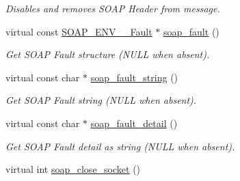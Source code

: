 \begin{DoxyCompactItemize}
\begin{DoxyCompactList}\small\item\em Disables and removes SOAP Header from message. \item\end{DoxyCompactList}\item 
\hypertarget{classPASSSubscriberPortBindingProxy_a106ca5a9746ff61aa711f6ff04305131}{
virtual const \hyperlink{structSOAP__ENV____Fault}{SOAP\_\-ENV\_\-\_\-Fault} $\ast$ \hyperlink{classPASSSubscriberPortBindingProxy_a106ca5a9746ff61aa711f6ff04305131}{soap\_\-fault} ()}
\label{classPASSSubscriberPortBindingProxy_a106ca5a9746ff61aa711f6ff04305131}

\begin{DoxyCompactList}\small\item\em Get SOAP Fault structure (NULL when absent). \item\end{DoxyCompactList}\item 
\hypertarget{classPASSSubscriberPortBindingProxy_a1224dd083ddc52755ff779de724a6c64}{
virtual const char $\ast$ \hyperlink{classPASSSubscriberPortBindingProxy_a1224dd083ddc52755ff779de724a6c64}{soap\_\-fault\_\-string} ()}
\label{classPASSSubscriberPortBindingProxy_a1224dd083ddc52755ff779de724a6c64}

\begin{DoxyCompactList}\small\item\em Get SOAP Fault string (NULL when absent). \item\end{DoxyCompactList}\item 
\hypertarget{classPASSSubscriberPortBindingProxy_af5951b083f1ae15ce7a68519801ca430}{
virtual const char $\ast$ \hyperlink{classPASSSubscriberPortBindingProxy_af5951b083f1ae15ce7a68519801ca430}{soap\_\-fault\_\-detail} ()}
\label{classPASSSubscriberPortBindingProxy_af5951b083f1ae15ce7a68519801ca430}

\begin{DoxyCompactList}\small\item\em Get SOAP Fault detail as string (NULL when absent). \item\end{DoxyCompactList}\item 
\hypertarget{classPASSSubscriberPortBindingProxy_a7b6c39eb35494c8d4513a39daccc52f4}{
virtual int \hyperlink{classPASSSubscriberPortBindingProxy_a7b6c39eb35494c8d4513a39daccc52f4}{soap\_\-close\_\-socket} ()}
\label{classPASSSubscriberPortBindingProxy_a7b6c39eb35494c8d4513a39daccc52f4}


\end{DoxyCompactItemize}
